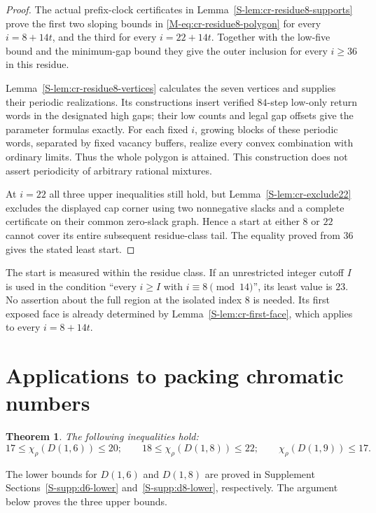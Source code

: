 \documentclass[11pt,reqno]{amsart}
\theoremstyle{plain}
\newtheorem{theorem}{Theorem}
\newcommand{\D}[1]{D(1,#1)}
\newcommand{\chirho}{\chi_{\rho}}
\theoremstyle{plain}
\theoremstyle{plain}
\begin{document}
\begin{proof}
The actual prefix-clock certificates in
Lemma~\ref*{S-lem:cr-residue8-supports} prove the first two sloping
bounds in \eqref{M-eq:cr-residue8-polygon} for every $i=8+14t$,
and the third for every $i=22+14t$. Together with the low-five
bound and the minimum-gap bound they give the outer inclusion for
every $i\ge36$ in this residue.

Lemma~\ref*{S-lem:cr-residue8-vertices} calculates the seven vertices
and supplies their periodic realizations. Its constructions insert
verified $84$-step low-only return words in the designated high
gaps; their low counts and legal gap offsets give the parameter
formulas exactly. For each fixed $i$, growing blocks of these
periodic words, separated by fixed vacancy buffers, realize every
convex combination with ordinary limits. Thus the whole polygon
is attained. This construction does not assert periodicity of
arbitrary rational mixtures.

At $i=22$ all three upper inequalities still hold, but
Lemma~\ref*{S-lem:cr-exclude22} excludes the displayed cap corner
using two nonnegative slacks and a complete certificate on their
common zero-slack graph. Hence a start at either $8$ or $22$
cannot cover its entire subsequent residue-class tail. The equality
proved from $36$ gives the stated least start.
\end{proof}

The start is measured within the residue class. If an unrestricted
integer cutoff $I$ is used in the condition ``every $i\ge I$ with
$i\equiv8\pmod {14}$'', its least value is $23$. No assertion
about the full region at the isolated index $8$ is needed. Its first
exposed face is already determined by
Lemma~\ref*{S-lem:cr-first-face}, which applies to every $i=8+14t$.

\section{Applications to packing chromatic numbers}\label{M-sec:constr}

\begin{theorem}\label{M-thm:main}
The following inequalities hold:
\[
17 \le \chirho(\D{6}) \le 20; \qquad
18 \le \chirho(\D{8}) \le 22; \qquad
\chirho(\D{9}) \le 17 .
\]
\end{theorem}
The lower bounds for $\D{6}$ and $\D{8}$ are proved in Supplement
Sections~\ref*{S-supp:d6-lower} and~\ref*{S-supp:d8-lower}, respectively.
The argument below proves the three upper bounds.
\end{document}
